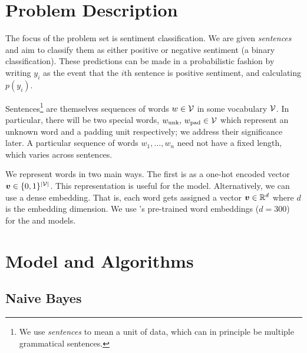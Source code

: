 \documentclass[11pt]{article}
\begin{document}



\section{Problem Description}

The focus of the problem set is sentiment classification. We are given
\emph{sentences} and aim to classify them as either positive or negative
sentiment (a binary classification). These predictions can be made in a
probabilistic fashion by writing $y_i$ as the event that the $i$th sentence is
positive sentiment, and calculating $p(y_i)$.

Sentences\footnote{We use \emph{sentences} to mean a unit of data, which can in
principle be multiple grammatical sentences.} are themselves sequences of words
$w \in \mathcal{V}$ in some vocabulary
$\mathcal{V}$. In particular, there will be two special words, $w_\text{unk},\,
w_\text{pad} \in \mathcal{V}$ which represent an unknown word and a padding unit
respectively; we address their significance later. A particular sequence of
words $w_1, \ldots, w_n$ need not have a fixed length, which varies
across sentences. 

We represent words in two main ways. The first is as a one-hot encoded vector
$\boldsymbol{v} \in \{0,1\}^{|\mathcal{V}|}$. This representation is useful for the
 model. Alternatively, we can use a dense embedding.
That is, each word gets assigned a vector $\boldsymbol{v} \in \mathbb{R}^d$ where $d$ is
the embedding dimension. We use \citet{mikolov2013efficient}'s pre-trained word
embeddings ($d=300$) for the  and 
models.

\section{Model and Algorithms}
\label{sec:models}

\subsection{Naive Bayes}
\label{subsec:nb}
\end{document}
